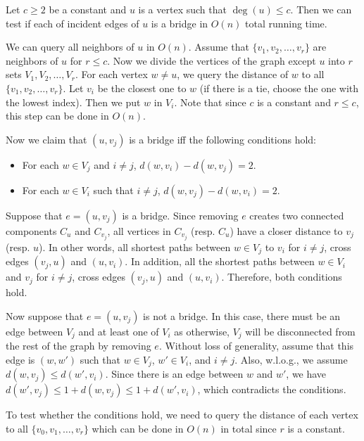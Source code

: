 \begin{lemma}\label{lem:test-bridge}
Let $c \geq 2$ be a constant and $u$ is a vertex such that $\deg(u) \leq c$. Then we can test if each of incident edges of $u$ is a bridge in  $O(n)$ total running time.
\end{lemma}
\begin{myproof}
We can query all neighbors of $u$ in $O(n)$. Assume that $\{v_1, v_2, \ldots, v_r\}$ are neighbors of $u$ for $r \leq c$. Now we divide the vertices of the graph except $u$ into $r$ sets $V_1, V_2, \ldots, V_r$. For each vertex $w \neq u$, we query the distance of $w$ to all $\{v_1, v_2, \ldots, v_r\}$. Let $v_i$ be the closest one to $w$ (if there is a tie, choose the one with the lowest index). Then we put $w$ in $V_i$. Note that since $c$ is a constant and $r \leq c$, this step can be done in $O(n)$.


Now we claim that $(u, v_j)$ is a bridge iff the following conditions hold:
\begin{itemize}
    \item For each $w \in V_j$ and $i \neq j$, $d(w, v_i) - d(w, v_j) = 2.$
    \item For each $w \in V_i$ such that $i \neq j$, $d(w, v_j) - d(w, v_i) = 2.$
\end{itemize}

Suppose that $e = (u, v_j)$ is a bridge. Since removing $e$ creates two connected components $C_u$ and $C_{v_j}$, all vertices in $C_{v_j}$ (resp. $C_u$) have a closer distance to $v_j$ (resp. $u$). In other words, all shortest paths between $w \in V_j$ to $v_i$ for $i \neq j$, cross edges $(v_j,u)$ and $(u, v_i)$. In addition, all the shortest paths between $w \in V_i$ and $v_j$ for $i \neq j$, cross edges $(v_j,u)$ and $(u, v_i)$. Therefore, both conditions hold.

Now suppose that $e = (u, v_j)$ is not a bridge. In this case, there must be an edge between $V_j$ and at least one of $V_i$ as otherwise, $V_j$ will be disconnected from the rest of the graph by removing $e$. Without loss of generality, assume that this edge is $(w, w')$ such that $w \in V_j$, $w' \in V_i$, and $i \neq j$. Also, w.l.o.g., we assume $d(w,v_j) \leq d(w', v_i)$. Since there is an edge between $w$ and $w'$, we have $d(w', v_j) \leq 1 + d(w, v_j) \leq 1 + d(w', v_i)$, which contradicts the conditions.

To test whether the conditions hold, we need to query the distance of each vertex to all $\{v_0, v_1, \ldots, v_r\}$ which can be done in $O(n)$ in total since $r$ is a constant.
\end{myproof}


